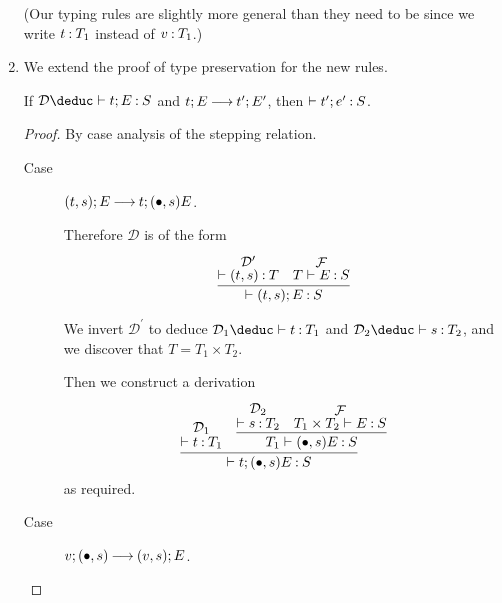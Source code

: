\documentclass[11pt]{article}
\begin{document}
\begin{enumerate}
    (Our typing rules are slightly more general than they need to be since we write
    $t \mathbin{:} T_1$ instead of $v \mathbin{:} T_1$.)

  \item
    We extend the proof of type preservation for the new rules.

    \begin{prop}
      If $\mathcal{D} \deduc \proves t; E \hastype S$
      and $t;E \mathbin{\longrightarrow} t^\prime ; E^\prime$,
      then $\vdash t^\prime ; e^\prime \mathbin{:} S$.
    \end{prop}

    \begin{proof}
      By case analysis of the stepping relation.

      \begin{description}
        \item[Case]
          $(t, s); E \mathbin{\longrightarrow} t; (\bullet, s) E$.

          Therefore $\mathcal{D}$ is of the form
          \begin{equation*}
            \infer{%
              \proves (t, s) ; E \hastype S
            }{%
              \deduce[\mathcal{D}^\prime]{\proves (t, s) \hastype T}{}
              &
              \deduce[\mathcal{F}]{T \proves E \hastype S}{}
            }
          \end{equation*}

          We invert $\mathcal{D}^\prime$ to
          deduce $\mathcal{D}_1 \deduc \proves t \hastype T_1$
          and $\mathcal{D}_2 \deduc \proves s \hastype T_2$,
          and we discover that $T = T_1 \times T_2$.

          Then we construct a derivation
          \begin{equation*}
            \infer{%
              \proves t ; (\bullet, s) E \hastype S
            }{%
              \deduce[\mathcal{D}_1]{\proves t \hastype T_1}{}
              &
              \infer{%
                T_1 \proves (\bullet, s) E \hastype S
              }{%
                \deduce[\mathcal{D}_2]{\proves s \hastype T_2}{}
                &
                \deduce[\mathcal{F}]{T_1 \times T_2 \proves E \hastype S}{}
              }
            }
          \end{equation*}
          as required.

        \item[Case]
          $v; (\bullet, s) \mathbin{\longrightarrow} (v, s) ; E$.


\end{description}
\end{proof}
\end{enumerate}
\end{document}
